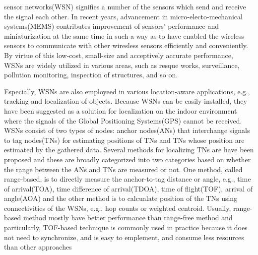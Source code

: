 \documentclass{ieeeaccess}
\begin{document}
 sensor networks(WSN) signifies a number of the sensors which send and receive the signal each other. In recent years, advancement in micro-electo-mechanical systems(MEMS) contributes improvement of sensors' performance and miniaturization at the same time in such a way as to have enabled the wireless sensors to communicate with other wiresless sensors efficiently and conveniently.  By virtue of this low-cost, small-size and acceptively accurate performance, WSNs are widely utilized in various areas, such as resque works, surveillance, pollution monitoring, inspection of structures, and so on\cite{li2009ern,khedo2010wireless,zhang2011indoor,kulaib2011overview}.  

Especially, WSNs are also employeed in various location-aware applications, e.g., tracking and localization of objects. Because WSNs can be easily installed, they have been suggested as a solution for localization on the indoor environment\cite{peneda2009trilateration, jung2011indoor} where the signals of the Global Positioning Systems(GPS) cannot be received. WSNs consist of two types of nodes: anchor nodes(ANs) that interchange signals to tag nodes(TNs) for estimating positions of TNs and TNs whose position are estimated by the gathered data. Several methods for localizing TNs are have been proposed and these are broadly categorized into two categories based on whether the range between the ANs and TNs are measured or not. One method, called range-based, is to directly measure the anchor-to-tag distance or angle, e.g., time of arrival(TOA)\cite{kaune2012accuracy}, time difference of arrival(TDOA)\cite{singh2013tdoa}, time of flight(TOF)\cite{jung2011indoor}, arrival of angle(AOA)\cite{douganccay2008optimal} and the other method is to calcualate position of the TNs using connectivities of the WSNs, e.g., hop counts\cite{banihashemian2018new} or weighted centroid\cite{blumenthal2007weighted}. Usually,   range-based method mostly have better performance than range-free method\cite{han2010pattern} and particularly, TOF-based technique is commonly used in practice because it does not need to synchronize, and is easy to emplement, and consume less resources than other approaches\cite{li2017novel}   
\end{document}
